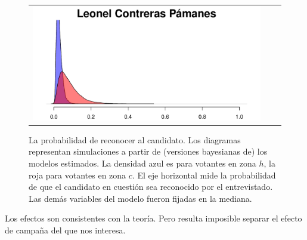\documentclass[letter,12pt]{article}
\begin{document}
\begin{figure}
\begin{tabular}{ccc}
    \includegraphics[width=.3\columnwidth]{../graphs/prReconoce8.pdf} \\
  \end{tabular}
  \caption{La probabilidad de reconocer al candidato. Los diagramas representan simulaciones a partir de (versiones bayesianas de) los modelos estimados. La densidad azul es para votantes en zona $h$, la roja para votantes en zona $c$. El eje horizontal mide la probabilidad de que el candidato en cuestión sea reconocido por el entrevistado. Las demás variables del modelo fueron fijadas en la mediana.}\label{f:sims}
\end{figure}

Los efectos son consistentes con la teoría. Pero resulta imposible separar el efecto de campaña del que nos interesa. 

\end{document}

